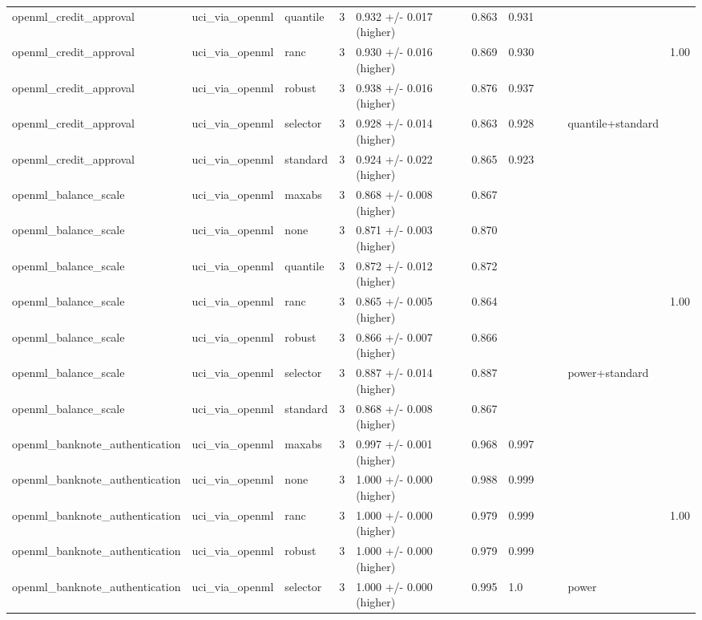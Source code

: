 \begin{tabular}{lllllllllll}
openml\_credit\_approval & uci\_via\_openml & quantile & 3 & 0.932 +/- 0.017 (higher) & 0.863 & 0.931 &  &  &  &  \\
openml\_credit\_approval & uci\_via\_openml & ranc & 3 & 0.930 +/- 0.016 (higher) & 0.869 & 0.930 &  &  &  & 1.00 \\
openml\_credit\_approval & uci\_via\_openml & robust & 3 & 0.938 +/- 0.016 (higher) & 0.876 & 0.937 &  &  &  &  \\
openml\_credit\_approval & uci\_via\_openml & selector & 3 & 0.928 +/- 0.014 (higher) & 0.863 & 0.928 &  &  & quantile+standard &  \\
openml\_credit\_approval & uci\_via\_openml & standard & 3 & 0.924 +/- 0.022 (higher) & 0.865 & 0.923 &  &  &  &  \\
openml\_balance\_scale & uci\_via\_openml & maxabs & 3 & 0.868 +/- 0.008 (higher) & 0.867 &  &  &  &  &  \\
openml\_balance\_scale & uci\_via\_openml & none & 3 & 0.871 +/- 0.003 (higher) & 0.870 &  &  &  &  &  \\
openml\_balance\_scale & uci\_via\_openml & quantile & 3 & 0.872 +/- 0.012 (higher) & 0.872 &  &  &  &  &  \\
openml\_balance\_scale & uci\_via\_openml & ranc & 3 & 0.865 +/- 0.005 (higher) & 0.864 &  &  &  &  & 1.00 \\
openml\_balance\_scale & uci\_via\_openml & robust & 3 & 0.866 +/- 0.007 (higher) & 0.866 &  &  &  &  &  \\
openml\_balance\_scale & uci\_via\_openml & selector & 3 & 0.887 +/- 0.014 (higher) & 0.887 &  &  &  & power+standard &  \\
openml\_balance\_scale & uci\_via\_openml & standard & 3 & 0.868 +/- 0.008 (higher) & 0.867 &  &  &  &  &  \\
openml\_banknote\_authentication & uci\_via\_openml & maxabs & 3 & 0.997 +/- 0.001 (higher) & 0.968 & 0.997 &  &  &  &  \\
openml\_banknote\_authentication & uci\_via\_openml & none & 3 & 1.000 +/- 0.000 (higher) & 0.988 & 0.999 &  &  &  &  \\
openml\_banknote\_authentication & uci\_via\_openml & ranc & 3 & 1.000 +/- 0.000 (higher) & 0.979 & 0.999 &  &  &  & 1.00 \\
openml\_banknote\_authentication & uci\_via\_openml & robust & 3 & 1.000 +/- 0.000 (higher) & 0.979 & 0.999 &  &  &  &  \\
openml\_banknote\_authentication & uci\_via\_openml & selector & 3 & 1.000 +/- 0.000 (higher) & 0.995 & 1.0 &  &  & power &  \\

\end{tabular}
